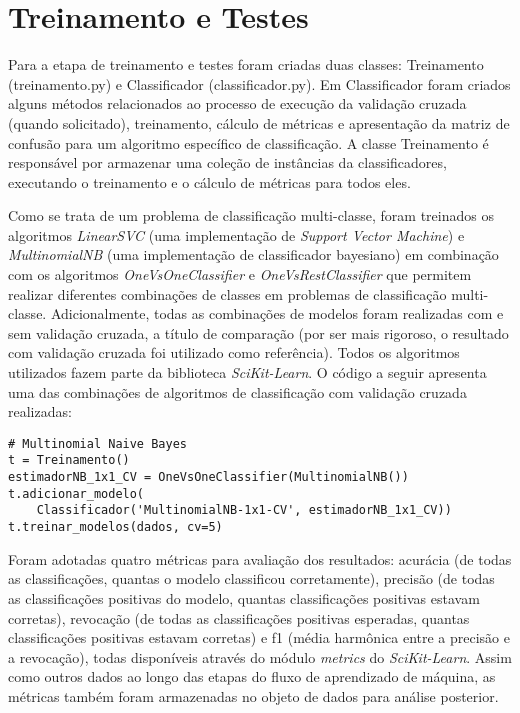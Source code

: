 \section{Treinamento e Testes}

Para a etapa de treinamento e testes foram criadas duas classes: Treinamento (treinamento.py) e Classificador (classificador.py). Em Classificador foram criados alguns  métodos relacionados ao processo de execução da validação cruzada (quando solicitado), treinamento, cálculo de métricas e apresentação da matriz de confusão para um algoritmo específico de classificação. A classe Treinamento é responsável por armazenar uma coleção de instâncias da classificadores, executando o treinamento e o cálculo de métricas para todos eles.

Como se trata de um problema de classificação multi-classe, foram treinados os algoritmos \textit{LinearSVC} (uma implementação de \textit{Support Vector Machine}) e \textit{MultinomialNB} (uma implementação de classificador bayesiano) em combinação com os algoritmos \textit{OneVsOneClassifier} e \textit{OneVsRestClassifier} que permitem realizar diferentes combinações de classes em problemas de classificação multi-classe. Adicionalmente, todas as combinações de modelos foram realizadas com e sem validação cruzada, a título de comparação (por ser mais rigoroso, o resultado com validação cruzada foi utilizado como referência). Todos os algoritmos utilizados fazem parte da biblioteca \textit{SciKit-Learn}. O código a seguir apresenta uma das combinações de algoritmos de classificação com validação cruzada realizadas:

\begin{lstlisting}
# Multinomial Naive Bayes 
t = Treinamento()
estimadorNB_1x1_CV = OneVsOneClassifier(MultinomialNB())
t.adicionar_modelo(
	Classificador('MultinomialNB-1x1-CV', estimadorNB_1x1_CV))
t.treinar_modelos(dados, cv=5)
\end{lstlisting}

Foram adotadas quatro métricas para avaliação dos resultados: acurácia (de todas as classificações, quantas o modelo classificou corretamente), precisão (de todas as classificações positivas do modelo, quantas classificações positivas estavam corretas), revocação (de todas as classificações positivas esperadas, quantas classificações positivas estavam corretas) e f1 (média harmônica entre a precisão e a revocação), todas disponíveis através do módulo \textit{metrics} do \textit{SciKit-Learn}. Assim como outros dados ao longo das etapas do fluxo de aprendizado de máquina, as métricas também foram armazenadas no objeto de dados para análise posterior. 